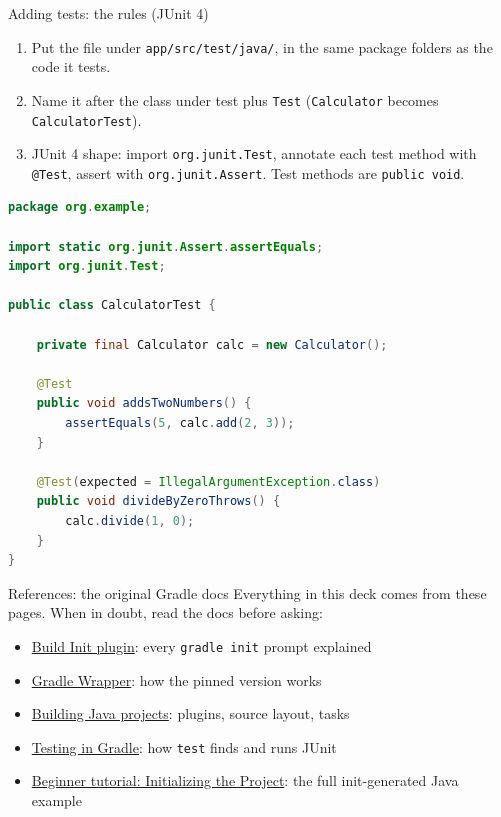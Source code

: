 \documentclass[11pt,aspectratio=169]{beamer}
\begin{document}
\begin{frame}[fragile]{Adding tests: the rules (JUnit 4)}
  \begin{enumerate}
    \item Put the file under \texttt{app/src/test/java/}, in the same
      package folders as the code it tests.
    \item Name it after the class under test plus \texttt{Test}
      (\texttt{Calculator} becomes \texttt{CalculatorTest}).
    \item JUnit 4 shape: import \texttt{org.junit.Test}, annotate each
      test method with \texttt{@Test}, assert with
      \texttt{org.junit.Assert}. Test methods are \texttt{public void}.
  \end{enumerate}
  \begin{lstlisting}[language=Java,basicstyle=\ttfamily\tiny]
package org.example;

import static org.junit.Assert.assertEquals;
import org.junit.Test;

public class CalculatorTest {

    private final Calculator calc = new Calculator();

    @Test
    public void addsTwoNumbers() {
        assertEquals(5, calc.add(2, 3));
    }

    @Test(expected = IllegalArgumentException.class)
    public void divideByZeroThrows() {
        calc.divide(1, 0);
    }
}
  \end{lstlisting}
\end{frame}

\begin{frame}{References: the original Gradle docs}
  Everything in this deck comes from these pages. When in doubt, read
  the docs before asking:
  \begin{itemize}
    \item \href{https://docs.gradle.org/current/userguide/build_init_plugin.html}{Build Init plugin}: every \texttt{gradle init} prompt explained
    \item \href{https://docs.gradle.org/current/userguide/gradle_wrapper.html}{Gradle Wrapper}: how the pinned version works
    \item \href{https://docs.gradle.org/current/userguide/building_java_projects.html}{Building Java projects}: plugins, source layout, tasks
    \item \href{https://docs.gradle.org/current/userguide/java_testing.html}{Testing in Gradle}: how \texttt{test} finds and runs JUnit
    \item \href{https://docs.gradle.org/current/userguide/part1_gradle_init.html}{Beginner tutorial: Initializing the Project}: the full init-generated Java example
  \end{itemize}
\end{frame}
\end{document}
